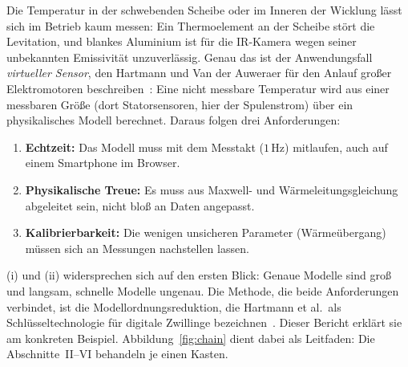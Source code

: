 \documentclass[a4paper, 10pt, conference]{ieeeconf}
\theoremstyle{remark}
\begin{document}
Die Temperatur in der schwebenden Scheibe oder im Inneren der Wicklung
lässt sich im Betrieb kaum messen: Ein Thermoelement an der Scheibe stört
die Levitation, und blankes Aluminium ist für die IR-Kamera wegen seiner
unbekannten Emissivität unzuverlässig. Genau das ist der Anwendungsfall
\emph{virtueller Sensor}, den Hartmann und Van der Auweraer für den
Anlauf großer Elektromotoren beschreiben~\cite{hartmann2025golden}: Eine
nicht messbare Temperatur wird aus einer messbaren Größe (dort
Statorsensoren, hier der Spulenstrom) über ein physikalisches Modell
berechnet. Daraus folgen drei Anforderungen:
\begin{enumerate}[label=(\roman*), leftmargin=*, nosep]
  \item \textbf{Echtzeit:} Das Modell muss mit dem Messtakt ($1\,\mathrm{Hz}$)
        mitlaufen, auch auf einem Smartphone im Browser.
  \item \textbf{Physikalische Treue:} Es muss aus Maxwell- und
        Wärmeleitungsgleichung abgeleitet sein, nicht bloß an Daten
        angepasst.
  \item \textbf{Kalibrierbarkeit:} Die wenigen unsicheren Parameter
        (Wärmeübergang) müssen sich an Messungen nachstellen lassen.
\end{enumerate}
(i) und (ii) widersprechen sich auf den ersten Blick: Genaue Modelle sind
groß und langsam, schnelle Modelle ungenau. Die Methode, die beide
Anforderungen verbindet, ist die Modellordnungsreduktion, die Hartmann et
al.\ als Schlüsseltechnologie für digitale Zwillinge
bezeichnen~\cite{hartmann2018mor}. Dieser Bericht erklärt sie am
konkreten Beispiel. Abbildung~\ref{fig:chain} dient dabei als Leitfaden:
Die Abschnitte~II--VI behandeln je einen Kasten.
\end{document}
